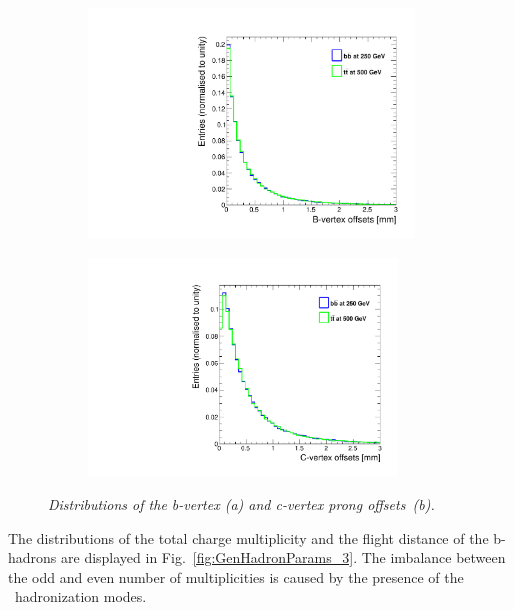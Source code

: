 \begin{figure}[h]
\centering
\begin{subfigure}{0.5\textwidth}
    \includegraphics[width=0.95\textwidth]{ILD/plots/gen-bvtx-offsets.pdf}
\caption{\label{fig:GenVtxOffset_a_3} }
\end{subfigure}%
  \begin{subfigure}{0.5\textwidth}
\centering
    \includegraphics[width=0.9\textwidth]{ILD/plots/gen-cvtx-offsets.pdf}
\caption{\label{fig:GenVtxOffset_b_3} }
\end{subfigure}
    \caption{\sl Distributions of the b-vertex (a) and c-vertex prong offsets~(b). }
    \label{fig:GenVtxOffset_3}
\end{figure}

The distributions of the total charge multiplicity and the flight distance of the b-hadrons are displayed in Fig.~\ref{fig:GenHadronParams_3}.
The imbalance between the odd and even number of multiplicities is caused by the presence of the \Bzs\ hadronization modes.

